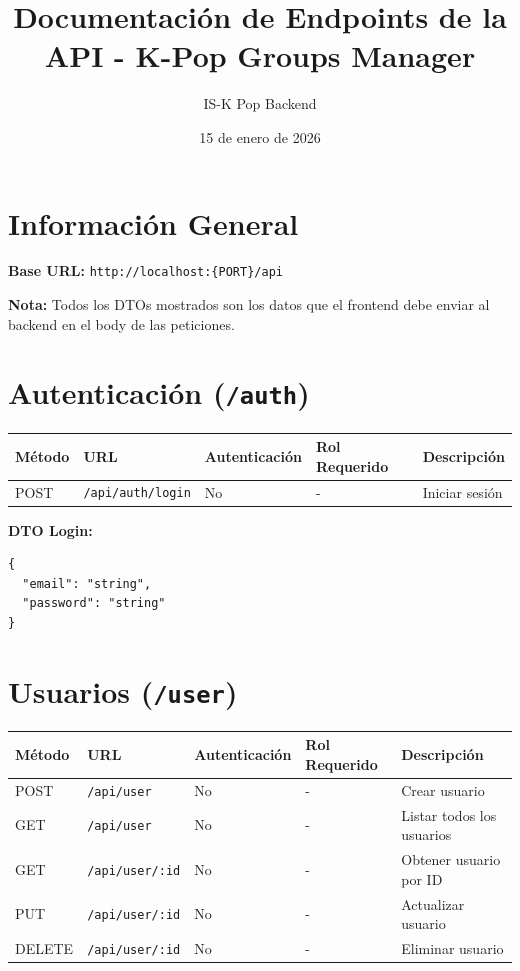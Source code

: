 \documentclass[11pt]{article}
\title{Documentación de Endpoints de la API - K-Pop Groups Manager}
\author{IS-K Pop Backend}
\date{15 de enero de 2026}
\begin{document}
\maketitle

\section*{Información General}

\textbf{Base URL:} \texttt{http://localhost:\{PORT\}/api}

\textbf{Nota:} Todos los DTOs mostrados son los datos que el frontend debe enviar al backend en el body de las peticiones.

\section{Autenticación (\texttt{/auth})}

\begin{longtable}{lllll}
\toprule
\textbf{Método} & \textbf{URL} & \textbf{Autenticación} & \textbf{Rol Requerido} & \textbf{Descripción} \\
\midrule
\endhead
POST & \texttt{/api/auth/login} & No & - & Iniciar sesión \\
\bottomrule
\end{longtable}

\textbf{DTO Login:}
\begin{Verbatim}
{
  "email": "string",
  "password": "string"
}
\end{Verbatim}

\section{Usuarios (\texttt{/user})}

\begin{longtable}{lllll}
\toprule
\textbf{Método} & \textbf{URL} & \textbf{Autenticación} & \textbf{Rol Requerido} & \textbf{Descripción} \\
\midrule
\endhead
POST & \texttt{/api/user} & No & - & Crear usuario \\
GET & \texttt{/api/user} & No & - & Listar todos los usuarios \\
GET & \texttt{/api/user/:id} & No & - & Obtener usuario por ID \\
PUT & \texttt{/api/user/:id} & No & - & Actualizar usuario \\
DELETE & \texttt{/api/user/:id} & No & - & Eliminar usuario \\
\bottomrule
\end{longtable}
\end{document}
